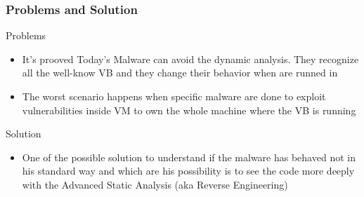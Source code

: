 \documentclass[]{beamer}
\begin{document}
		\begin{frame}
			\frametitle{Problems and Solution}
			\begin{block}{Problems}
				\begin{itemize}
					\item{It's prooved Today's Malware can avoid the dynamic analysis. They recognize all the well-know VB and they change their behavior when are runned in }
					\item{The worst scenario happens when specific malware are done to exploit vulnerabilities inside VM to own the whole machine where the VB is running}
				\end{itemize}
			\end{block}
			\begin{block}{Solution}
				\begin{itemize}
					\item{One of the possible solution to understand if the malware has behaved not in his standard way and which are his possibility is to see the code more deeply with the Advanced Static Analysis (aka Reverse Engineering) }
				\end{itemize}
			\end{block}
		\end{frame}
\end{document}
